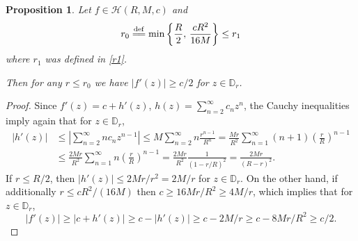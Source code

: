 \documentclass[reqno,11pt]{amsart}
\theoremstyle{plain}
\newtheorem{prop}[thm]{Proposition}
\theoremstyle{definition}
\theoremstyle{remark}
\numberwithin{equation}{section}
\numberwithin{equation}{section}
\newcommand{\D}{\mathbb{D}}
\newcommand{\isdef}{\overset{\mathrm{def}}{=\joinrel=}}
\begin{document}
\begin{prop}
	\label{LemmaAux2} 
	Let   $f \in \mathcal H(R, M, c)$ and
\begin{equation}\label{1}
r_0 \isdef  \min\left\{\frac R2, \, \frac{cR^2}{16 M}\right\}\le r_1
\end{equation}
where $r_1$ was defined in \eqref{r1}. 

Then for any $r \leq r_0$ we have $|f'(z)| \geq c/2 $ for $z \in \D_r$.
\end{prop}
\begin{proof}
Since $f'(z) = c + h'(z)$, $h(z) = \sum_{ n =2}^\infty c_n z^n$, the Cauchy inequalities imply again that  for $z \in \D_r$,
\begin{align*}
|h'(z)| & \leq \left|  \sum_{ n =2}^\infty n c_n z^{n-1}\right| \leq M  \sum_{ n =2}^\infty n \frac{r^{n-1}}{R^n} =
\frac{Mr}{R^2} \sum_{ n = 1}^\infty (n+1)\left(\frac rR\right)^{n -1} \\
& \leq \frac{2Mr}{R^2}\sum_{ n = 1}^\infty n\left(\frac rR\right)^{n -1} 
= \frac{2Mr}{R^2} \frac 1{(1-r/R)^2} = \frac {2Mr}{(R-r)^2}.
\end{align*}
If $r \leq R/2$, then $|h'(z)| \leq 2 Mr/r^2=2M/r$ for $ z \in \D_r$. On the other hand, if additionally $r\le cR^2/(16 M) $ then  $c \geq 16 Mr/ R^2\ge 4M/r$, which implies that for $ z \in \D_r$,
$$ 
|f'(z)| \geq |c + h'(z)| \geq c - |h'(z)| \geq c - 2M/r \geq c - 8Mr/R^2 \geq c/2.
$$
\end{proof}
\end{document}
